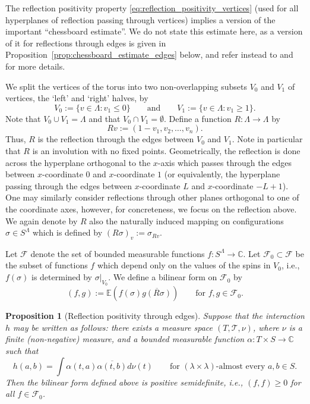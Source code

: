 \documentclass[12pt,reqno]{article}
\def\C{\mathbb{C}}
\def\E{\mathbb{E}}
\newtheorem{proposition}[theorem]{Proposition}
\newcommand{\cF}{\mathcal{F}}
\begin{document}
The reflection positivity property \eqref{eq:reflection_positivity_vertices} (used for all hyperplanes of reflection passing through vertices) implies a version of the important ``chessboard estimate''. We do not state this estimate here, as a version of it for reflections through edges is given in Proposition~\ref{prop:chessboard_estimate_edges} below, and refer instead to \cite{biskup2009reflection} and \cite[Chapter 10]{friedli2016statistical} for more details.

\medbreak
{}
We split the vertices of the torus into two non-overlapping subsets $V_0$ and $V_1$ of vertices, the `left' and `right' halves, by
\[ V_0 := \big\{ v \in \Lambda : v_1 \le 0 \big\} \qquad\text{and}\qquad V_1 := \big\{ v \in \Lambda : v_1 \ge 1 \big\} .\]
Note that $V_0 \cup V_1 = \Lambda$ and that $V_0 \cap V_1 = \emptyset$.
Define a function $R \colon \Lambda \to \Lambda$ by
\[ Rv := (1-v_1,v_2,\dots,v_n) .\]
Thus, $R$ is the reflection through the edges between $V_0$ and $V_1$.
Note in particular that $R$ is an involution with no fixed points.
Geometrically, the reflection is done across the hyperplane
orthogonal to the $x$-axis which passes through the edges between
$x$-coordinate $0$ and $x$-coordinate $1$ (or equivalently, the
hyperplane passing through the edges between $x$-coordinate $L$ and
$x$-coordinate $-L+1$). One may similarly consider reflections
through other planes orthogonal to one of the coordinate axes,
however, for concreteness, we focus on the reflection above.
We again denote by $R$ also the naturally induced mapping on configurations $\sigma \in S^\Lambda$ which is defined by $(R\sigma)_v := \sigma_{Rv}$.

Let $\cF$ denote the set of bounded measurable functions $f \colon S^\Lambda \to \C$.
Let $\cF_0 \subset \cF$ be the subset of functions $f$ which depend only on the values of the spins in $V_0$, i.e., $f(\sigma)$ is determined by $\sigma|_{V_0}$.
We define a bilinear form on $\cF_0$ by
\begin{equation}\label{eq:bilinear_form_edge_reflection}
(f,g) := \E\left(f(\sigma) \overline{g(R\sigma)}\right) \qquad\text{for }f,g \in \cF_0 .
\end{equation}

\begin{proposition}[Reflection positivity through edges]\label{prop:reflection_positivity_through_edges}
	Suppose that the interaction $h$ may be written as follows: there exists a measure space $(T,\mathcal{T},\nu)$, where $\nu$ is a finite (non-negative) measure, and a bounded measurable function $\alpha \colon T \times S \to \C$ such that
\begin{equation}\label{eq:h_semidefinite_representation}
  h(a,b) = \int \alpha(t,a) \overline{\alpha(t,b)} d\nu(t) \qquad\text{for $(\lambda\times\lambda)$-almost every $a,b \in S$}.
\end{equation}
	Then the bilinear form defined above is positive semidefinite, i.e., $(f,f) \ge 0$ for all $f \in \cF_0$.
\end{proposition}
\end{document}
